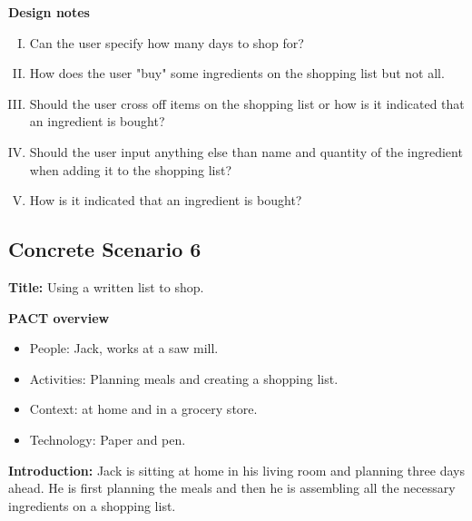 \textbf{Design notes}

\begin{enumerate} [(I)]
\item Can the user specify how many days to shop for?
\item How does the user "buy" some ingredients on the shopping list but not all.
\item Should the user cross off items on the shopping list or how is it indicated that an ingredient is bought?
\item Should the user input anything else than name and quantity of the ingredient when adding it to the shopping list?
\item How is it indicated that an ingredient is bought?
\end{enumerate}

\subsection{Concrete Scenario 6} \label{ConcreteScenario6}

\textbf{Title:} Using a written list to shop.

\textbf{PACT overview}
\begin{itemize}
\item People: Jack, works at a saw mill. 
\item Activities: Planning meals and creating a shopping list.
\item Context: at home and in a grocery store.
\item Technology: Paper and pen.
\end{itemize}

\textbf{Introduction:} Jack is sitting at home in his living room and planning three days ahead. He is first planning the meals and then he is assembling all the necessary ingredients on a shopping list. 

